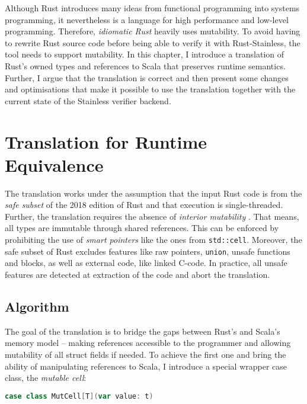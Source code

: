 Although Rust introduces many ideas from functional programming into systems
programming, it nevertheless is a language for high performance and low-level
programming. Therefore, \emph{idiomatic Rust} heavily uses mutability. To avoid
having to rewrite Rust source code before being able to verify it with
Rust-Stainless, the tool needs to support mutability. In this chapter, I
introduce a translation of Rust's owned types and references to Scala that
preserves runtime semantics. Further, I argue that the translation is correct
and then present some changes and optimisations that make it possible to use the
translation together with the current state of the Stainless verifier backend.

\section{Translation for Runtime Equivalence}
\label{sec:translation}

The translation works under the assumption that the input Rust code is from the
\emph{safe subset} \cite[section ``Unsafety'']{rustref} of the 2018 edition of
Rust and that execution is single-threaded. Further, the translation requires
the absence of \emph{interior mutability} \cite[section ``Interior
Mutability'']{rustref}. That means, all types are immutable through shared
references. This can be enforced by prohibiting the use of \emph{smart pointers}
like the ones from \passthrough{\lstinline!std::cell!}. Moreover, the safe
subset of Rust excludes features like raw pointers,
\passthrough{\lstinline!union!}, unsafe functions and blocks, as well as
external code, like linked C-code. In practice, all unsafe features are detected
at extraction of the code and abort the translation.


\subsection{Algorithm}

The goal of the translation is to bridge the gaps between Rust's and Scala's
memory model -- making references accessible to the programmer and allowing
mutability of all struct fields if needed. To achieve the first one and bring
the ability of manipulating references to Scala, I introduce a special wrapper
case class, the \emph{mutable cell}:

\begin{lstlisting}[language=Scala, style=short]
case class MutCell[T](var value: t)
\end{lstlisting}

